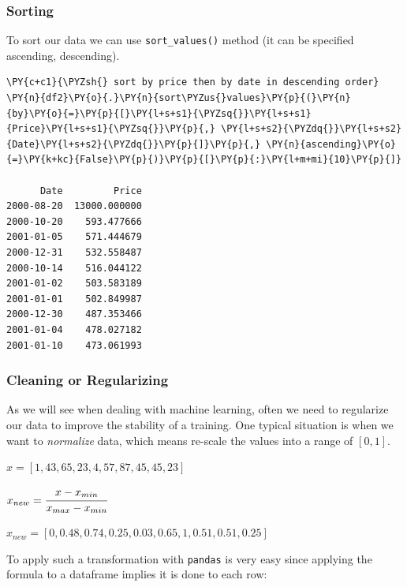 \subsubsection{Sorting}\label{sorting}

To sort our data we can use \texttt{sort\_values()} method (it can be specified ascending, descending).

\begin{tcolorbox}[breakable, size=fbox, boxrule=1pt, pad at break*=1mm,colback=cellbackground, colframe=cellborder]
\begin{Verbatim}[commandchars=\\\{\}]
\PY{c+c1}{\PYZsh{} sort by price then by date in descending order}
\PY{n}{df2}\PY{o}{.}\PY{n}{sort\PYZus{}values}\PY{p}{(}\PY{n}{by}\PY{o}{=}\PY{p}{[}\PY{l+s+s1}{\PYZsq{}}\PY{l+s+s1}{Price}\PY{l+s+s1}{\PYZsq{}}\PY{p}{,} \PY{l+s+s2}{\PYZdq{}}\PY{l+s+s2}{Date}\PY{l+s+s2}{\PYZdq{}}\PY{p}{]}\PY{p}{,} \PY{n}{ascending}\PY{o}{=}\PY{k+kc}{False}\PY{p}{)}\PY{p}{[}\PY{p}{:}\PY{l+m+mi}{10}\PY{p}{]}

      Date         Price
2000-08-20  13000.000000
2000-10-20    593.477666
2001-01-05    571.444679
2000-12-31    532.558487
2000-10-14    516.044122
2001-01-02    503.583189
2001-01-01    502.849987
2000-12-30    487.353466
2001-01-04    478.027182
2001-01-10    473.061993
\end{Verbatim}
\end{tcolorbox}
        
\subsubsection{Cleaning or Regularizing}\label{cleaning-or-regularizing}

As we will see when dealing with machine learning, often we need to regularize our data to 
improve the stability of a training. One typical situation is when we want to \emph{normalize} 
data, which means re-scale the values into a range of $[0, 1]$.

\(x = [1,43,65,23,4,57,87,45,45,23]\)

\(x_{new} = \cfrac{x - x_{min}}{x_{max} - x_{min}}\)

\(x_{new} = [0,0.48,0.74,0.25,0.03,0.65,1,0.51,0.51,0.25]\)

To apply such a transformation with \texttt{pandas} is very easy since applying the formula to a 
dataframe implies it is done to each row:

